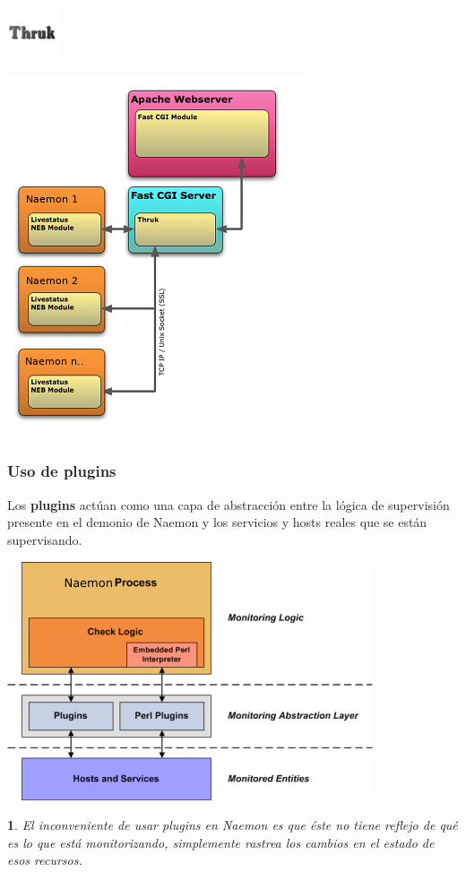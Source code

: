 \documentclass{beamer}
\theoremstyle{plain}
\theoremstyle{definition}
\theoremstyle{plain}
\newtheorem{prop}[thm]{}
\theoremstyle{definition}
\theoremstyle{remark}
\theoremstyle{definition}
\begin{document}
\begin{frame}
	\frametitle{\includegraphics[width=1.5cm]{imagenes/thruk.png}}
	
	\centering
	\includegraphics[scale=0.4]{imagenes/arquitecturaThruk.png}
	
\end{frame}
\begin{frame}
	\frametitle{Uso de plugins}
	\begin{block}
		
		Los \textbf{plugins} actúan como una capa de abstracción entre la lógica de supervisión presente en el demonio de Naemon y los servicios y hosts reales que se están supervisando.
	\end{block}
	\centering
	\includegraphics[scale=0.3]{imagenes/plugins.png}
	
	\begin{prop}
		El inconveniente de usar plugins en Naemon es que éste no tiene reflejo de qué es lo que está monitorizando, simplemente rastrea los cambios en el estado de esos recursos.
	\end{prop}
	
\end{frame}
\end{document}
